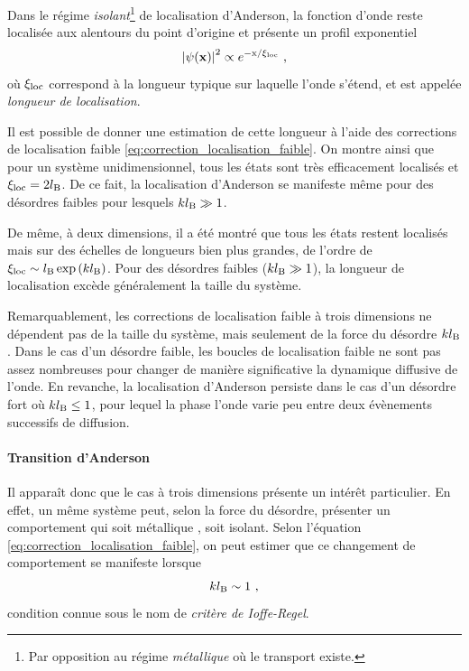 Dans le régime \emph{isolant}\footnote{Par opposition au régime \emph{métallique} où le transport existe.} de localisation d'Anderson, la fonction d'onde reste localisée aux alentours du point d'origine et présente un profil exponentiel
\begin{equation}
\left| \psi (\mathbf{x}) \right|^2 \propto e^{-\mathrm{x}/\xi_{\mathrm{loc}}} \text{ ,}
\end{equation}
où $\xi_{\mathrm{loc}}$ correspond à la longueur typique sur laquelle l'onde s'étend, et est appelée \emph{longueur de localisation}.

Il est possible de donner une estimation de cette longueur à l'aide des corrections de localisation faible \ref{eq:correction_localisation_faible}. On montre ainsi que pour un système unidimensionnel, tous les états sont très efficacement localisés et $\xi_{\mathrm{loc}}=2 l_{\mathrm{B}}$. De ce fait, la localisation d'Anderson se manifeste même pour des désordres faibles pour lesquels $kl_{\mathrm{B}} \gg 1$. 

De même, à deux dimensions, il a été montré que tous les états restent localisés mais sur des échelles de longueurs bien plus grandes, de l'ordre de $\xi_{\mathrm{loc}} \sim l_{\mathrm{B}} \exp{(k l_{\mathrm{B}})}$. Pour des désordres faibles ($k l_{\mathrm{B}} \gg 1$), la longueur de localisation excède généralement la taille du système. 

Remarquablement, les corrections de localisation faible à trois dimensions ne dépendent pas de la taille du système, mais seulement de la force du désordre $k l_{\mathrm{B}}$. Dans le cas d'un désordre faible, les boucles de localisation faible ne sont pas assez nombreuses pour changer de manière significative la dynamique diffusive de l'onde. En revanche, la localisation d'Anderson persiste dans le cas d'un désordre fort où $k l_{\mathrm{B}} \leq 1$, pour lequel la phase l'onde varie peu entre deux évènements successifs de diffusion. 



\paragraph*{Transition d'Anderson}
Il apparaît donc que le cas à trois dimensions présente un intérêt particulier. En effet, un même système peut, selon la force du désordre, présenter un comportement qui soit métallique , soit isolant. Selon l'équation \ref{eq:correction_localisation_faible}, on peut estimer que ce changement de comportement se manifeste lorsque
\begin{equation}
k l_{\mathrm{B}} \sim 1 \text{ ,}
\label{eq:ioffe_regel}
\end{equation}
condition connue sous le nom de \emph{critère de Ioffe-Regel}. 

